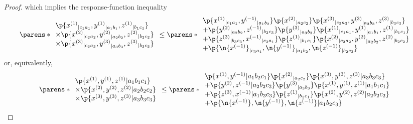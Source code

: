 \begin{widetext}
\begin{proof}
which implies the response-function inequality
\begin{align}
&\parens*{\begin{array}{l}
  \p{ {x^{(1)}}_{|c_1 a_1} , {y^{(1)}}_{|a_1 b_1} , {z^{(1)}}_{|b_1 c_1} }
   \\\times\p{ {x^{(2)}}_{|c_2 a_2} , {y^{(2)}}_{|a_2 b_2} , {z^{(2)}}_{|b_2 c_2} }
   \\\times\p{ {x^{(3)}}_{|c_3 a_3} , {y^{(3)}}_{|a_3 b_3} , {z^{(3)}}_{|b_3 c_3} }
\end{array}}
         \leq
 \parens*{\begin{array}{l}
\p{ {x^{(1)}}_{|c_1 a_1} , {y^{(-1)}}_{|a_1 b_2} }\p{ {x^{(2)}}_{|a_2 c_2} }\p{ {x^{(3)}}_{|c_3 a_3} , {y^{(3)}}_{|a_3 b_3} , {z^{(3)}}_{|b_3 c_3} }
\\ + \p{ {y^{(2)}}_{|a_2 b_2} , {z^{(-1)}}_{|b_2 c_3} }\p{ {y^{(3)}}_{|a_3 b_3} }\p{ {x^{(1)}}_{|c_1 a_1} , {y^{(1)}}_{|a_1 b_1} , {z^{(1)}}_{|b_1 c_1} }
\\ + \p{ {z^{(3)}}_{|b_3 c_3} , {x^{(-1)}}_{|c_3 a_1} }\p{ {z^{(1)}}_{|b_1 c_1} }\p{ {x^{(2)}}_{|c_2 a_2} , {y^{(2)}}_{|a_2 b_2} , {z^{(2)}}_{|b_2 c_2} }
\\ + \p{ \n{x^{(-1)}}_{|c_3 a_1} , \n{y^{(-1)}}_{|a_1 b_2} , \n{z^{(-1)}}_{|b_2 c_3} }
\end{array}}
\end{align}
or, equivalently,
\begin{align}
&\parens*{\begin{array}{l}
  \p{ {x^{(1)}} , {y^{(1)}} , {z^{(1)}} | a_1 b_1 c_1}
   \\\times\p{ {x^{(2)}} , {y^{(2)}} , {z^{(2)}} | a_2 b_2 c_2}
   \\\times\p{ {x^{(3)}} , {y^{(3)}} , {z^{(3)}} | a_3 b_3 c_3}
\end{array}}
         \leq
 \parens*{\begin{array}{l}
    \p{ {x^{(1)}} , {y^{(-1)}} | a_1 b_2 c_1 }\p{{x^{(2)}}_{| a_2 c_2} }\p{ {x^{(3)}} , {y^{(3)}} , {z^{(3)}} | a_3 b_3 c_3 }
\\ +\p{ {y^{(2)}} , {z^{(-1)}} | a_2 b_2 c_3 }\p{{y^{(3)}}_{| a_3 b_3} }\p{ {x^{(1)}} , {y^{(1)}} , {z^{(1)}} | a_1 b_1 c_1 }
\\ +\p{ {z^{(3)}} , {x^{(-1)}} | a_1 b_3 c_3 }\p{{z^{(1)}}_{| b_1 c_1} }\p{ {x^{(2)}} , {y^{(2)}} , {z^{(2)}} | a_2 b_2 c_2 }
\\ + \p{ \n{x^{(-1)}} , \n{y^{(-1)}} , \n{z^{(-1)}} | a_1 b_2 c_3}
\end{array}}
\end{align}


\end{proof}
\end{widetext}
